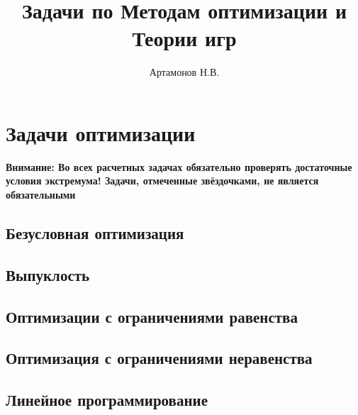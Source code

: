 \documentclass[12pt]{article}
\title{Задачи по Методам оптимизации и Теории игр}
\author{Артамонов Н.В.}
\theoremstyle{remark}
\begin{document}
\maketitle

\tableofcontents

\section{Задачи оптимизации}

\textbf{Внимание: Во всех расчетных задачах обязательно проверять достаточные условия экстремума!
Задачи, отмеченные звёздочками, не является обязательными}

\subsection{Безусловная оптимизация}



\subsection{Выпуклость}



\subsection{Оптимизации с ограничениями  равенства}



\subsection{Оптимизация с ограничениями неравенства}



\subsection{Линейное программирование}




% 

\appendix
\end{document}

